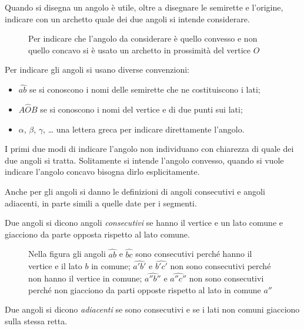 Quando si disegna un angolo è utile, oltre a disegnare le semirette e l'origine, indicare con un archetto quale dei due angoli si intende considerare.

\begin{figure}[htb]
 \centering 
\caption{Per indicare che l'angolo da considerare è quello convesso e non quello concavo si è usato un archetto in prossimità del vertice $O$}\label{fig:1.21}
\end{figure}

Per indicare gli angoli si usano diverse convenzioni:
\begin{itemize}
\item  $\widehat{ab}$ se si conoscono i nomi delle semirette che ne costituiscono i lati;
\item  $A\widehat{O}B$ se si conoscono i nomi del vertice e di due punti sui lati;
\item  $\alpha$, $\beta$, $\gamma$, \ldots{} una lettera greca per indicare direttamente l'angolo.
\end{itemize}
I primi due modi di indicare l'angolo non individuano con chiarezza di quale dei due angoli si tratta. Solitamente si intende l'angolo convesso, quando si vuole indicare l'angolo concavo bisogna dirlo esplicitamente.

Anche per gli angoli si danno le definizioni di angoli consecutivi e angoli adiacenti, in parte simili a quelle date per i segmenti.

\begin{definizione}
Due angoli si dicono angoli \emph{consecutivi} se hanno il vertice e un lato comune e giacciono da parte opposta rispetto al lato comune.
\end{definizione}

\begin{figure}[htb]
 \centering 
\caption{Nella figura gli angoli  $\widehat{ab}$ e $\widehat{bc}$  sono consecutivi perché hanno il vertice e il lato $ b $ in comune;  $\widehat {a'b'}$ e $\widehat {b'c'}$  non sono consecutivi perché non hanno il vertice in comune;  $\widehat {a''b''}$ e $\widehat {a''c''}$ non sono consecutivi perché non giacciono da parti opposte rispetto al lato in comune $a''$}\label{fig:1.22}
\end{figure}

\begin{definizione}
Due angoli si dicono \emph{adiacenti} se sono consecutivi e se i lati non comuni giacciono sulla stessa retta.
\end{definizione}


